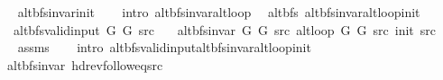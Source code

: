 \begin{isabellebody}
\endisataginvisible
{\isafoldinvisible}%
%
\isadeliminvisible
\isanewline
%
\endisadeliminvisible
%
\isadelimproof
\ \ %
\endisadelimproof
%
\isatagproof
{}\isamarkupfalse%
\ alt{\isacharunderscore}{\kern0pt}bfs{\isacharunderscore}{\kern0pt}invar{\isacharunderscore}{\kern0pt}init\isanewline
\ \ \isamarkupfalse%
\ {\isacharparenleft}{\kern0pt}intro\ alt{\isacharunderscore}{\kern0pt}bfs{\isacharunderscore}{\kern0pt}invar{\isacharunderscore}{\kern0pt}alt{\isacharunderscore}{\kern0pt}loop{\isacharparenright}{\kern0pt}%
\endisatagproof
{\isafoldproof}%
%
\isadelimproof
\isanewline
%
\endisadelimproof
%
\isadeliminvisible
\isanewline
%
\endisadeliminvisible
%
\isataginvisible
{}\isamarkupfalse%
\ {\isacharparenleft}{\kern0pt}\ alt{\isacharunderscore}{\kern0pt}bfs{\isacharparenright}{\kern0pt}\ alt{\isacharunderscore}{\kern0pt}bfs{\isacharunderscore}{\kern0pt}invar{\isacharunderscore}{\kern0pt}alt{\isacharunderscore}{\kern0pt}loop{\isacharunderscore}{\kern0pt}init{\isacharcolon}{\kern0pt}\isanewline
\ \ \ {\isachardoublequoteopen}alt{\isacharunderscore}{\kern0pt}bfs{\isacharunderscore}{\kern0pt}valid{\isacharunderscore}{\kern0pt}input{\isacharprime}{\kern0pt}\ G{}\ G{}\ src{\isachardoublequoteclose}\isanewline
\ \ \ {\isachardoublequoteopen}alt{\isacharunderscore}{\kern0pt}bfs{\isacharunderscore}{\kern0pt}invar{\isacharprime}{\kern0pt}\ G{}\ G{}\ src\ {\isacharparenleft}{\kern0pt}alt{\isacharunderscore}{\kern0pt}loop\ G{}\ G{}\ src\ {\isacharparenleft}{\kern0pt}init\ src{\isacharparenright}{\kern0pt}{\isacharparenright}{\kern0pt}{\isachardoublequoteclose}%
\endisataginvisible
{\isafoldinvisible}%
%
\isadeliminvisible
\isanewline
%
\endisadeliminvisible
%
\isadelimproof
\ \ %
\endisadelimproof
%
\isatagproof
{}\isamarkupfalse%
\ assms\isanewline
\ \ \isamarkupfalse%
\ {\isacharparenleft}{\kern0pt}intro\ alt{\isacharunderscore}{\kern0pt}bfs{\isacharunderscore}{\kern0pt}valid{\isacharunderscore}{\kern0pt}input{\isachardot}{\kern0pt}alt{\isacharunderscore}{\kern0pt}bfs{\isacharunderscore}{\kern0pt}invar{\isacharunderscore}{\kern0pt}alt{\isacharunderscore}{\kern0pt}loop{\isacharunderscore}{\kern0pt}init{\isacharparenright}{\kern0pt}%
\endisatagproof
{\isafoldproof}%
%
\isadelimproof
\isanewline
%
\endisadelimproof
\isanewline
{}\isamarkupfalse%
\ {\isacharparenleft}{\kern0pt}\ alt{\isacharunderscore}{\kern0pt}bfs{\isacharunderscore}{\kern0pt}invar{\isacharparenright}{\kern0pt}\ hd{\isacharunderscore}{\kern0pt}rev{\isacharunderscore}{\kern0pt}follow{\isacharunderscore}{\kern0pt}eq{\isacharunderscore}{\kern0pt}src{\isacharcolon}{\kern0pt}\isanewline

\end{isabellebody}
